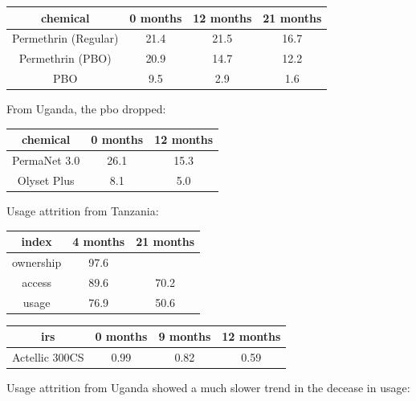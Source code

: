 \documentclass[a4paper, 12pt, twoside]{report}
\begin{document}
\begin{center}
	\begin{tabular}{cSSS}
		\toprule
    chemical             & {0 months} & {12 months} & {21 months} \\
		\midrule
		Permethrin (Regular) & 21.4     & 21.5      & 16.7      \\
		Permethrin (PBO)     & 20.9     & 14.7      & 12.2      \\
		PBO                  & 9.5      & 2.9       & 1.6       \\
		\bottomrule
	\end{tabular}
\end{center}

From Uganda\cite{Staedke2020}, the \gls{pbo} dropped:
\begin{center}
	\begin{tabular}{cSS}
		\toprule
    chemical     & {0 months} & {12 months} \\
		\midrule
		PermaNet 3.0 & 26.1    & 15.3    \\
		Olyset Plus  & 8.1     & 5.0      \\
		\bottomrule
	\end{tabular}
\end{center}

Usage attrition from Tanzania\cite{Protopopoff2018}:

\begin{center}
	\begin{tabular}{cSS}
		\toprule
    index     & {4 months} & {21 months} \\
		\midrule
		ownership & 97.6     &           \\
		access    & 89.6     & 70.2      \\
		usage     & 76.9     & 50.6      \\
		\bottomrule
	\end{tabular}
\end{center}

\begin{center}
	\begin{tabular}{cSSS}
		\toprule
    \gls{irs}      & {0 months} & {9 months} & {12 months}\\
    \midrule
		Actellic 300CS & 0.99     & 0.82     & 0.59      \\
    \bottomrule
	\end{tabular}
\end{center}

Usage attrition from Uganda\cite{Staedke2020} showed a much slower trend in the decease in usage:
\end{document}
